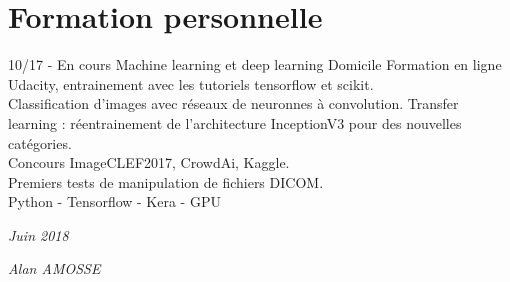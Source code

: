\documentclass[]{friggeri-cv}
\begin{document}
\section{Formation personnelle}
\begin{entrylist}
  \entry
    {10/17 - En cours}
    {Machine learning et deep learning}
    {Domicile}
    {Formation en ligne Udacity, entrainement avec les tutoriels tensorflow et scikit.\\
    Classification d'images avec réseaux de neuronnes à convolution. Transfer learning : réentrainement de l'architecture InceptionV3 pour des nouvelles catégories.\\
    Concours ImageCLEF2017, CrowdAi, Kaggle.\\
    Premiers tests de manipulation de fichiers DICOM.\\
    Python - Tensorflow - Kera - GPU}
\end{entrylist}
\begin{flushleft}
\emph{Juin 2018}
\end{flushleft}
\begin{flushright}
\emph{Alan AMOSSE}
\end{flushright}
% 
\end{document}
